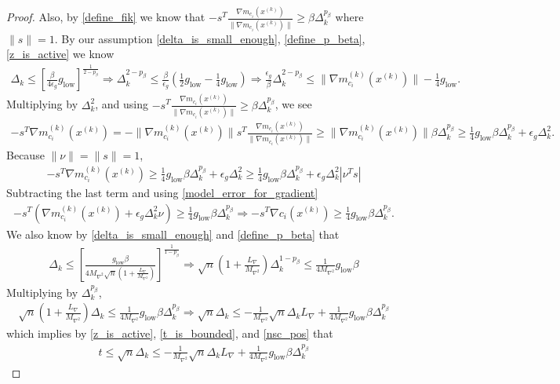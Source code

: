 \documentclass{article}
\theoremstyle{case}
\newcommand{\dk}{\Delta_k}
\newcommand{\gmcik}{{\nabla m_{c_i}^{(k)}\left(\xk\right)}}
\newcommand{\hgik}{{\frac{\nabla m_{c_i}(\xk)}{\|\nabla m_{c_i}(\xk)\|}}}
\newcommand{\lipgrad}{{L_{\nabla}}}
\newcommand{\maxhessian}{{M_{\nabla^2}}}
\newcommand{\mingrad}{{ g_{\text{low}} }}
\newcommand{\xk}{{x^{(k)}}}
\begin{document}
\begin{proof}
Also, by \cref{define_fik} we know that $-s^T \hgik \ge \beta \dk^{p_{\beta}}$ where $\|s\| = 1$.
By our assumption \cref{delta_is_small_enough}, \cref{define_p_beta}, \cref{z_is_active} we know
\begin{align*}
\dk \le \left[\frac{\beta}{4\epsilon_{g}}\mingrad \right]^{\frac 1 {2 - p_{\beta}}}
\Longrightarrow \dk^{2 - p_{\beta}} \le \frac{\beta}{\epsilon_{g}}\left(\frac 1 2\mingrad  - \frac 1 4 \mingrad \right)
\Longrightarrow \frac{\epsilon_{g}}{\beta} \dk^{2 - p_{\beta}} \le \|\gmcik\| - \frac 1 4 \mingrad.
\end{align*}
Multiplying by $\dk^2$, and using $-s^T \hgik \ge \beta \dk^{p_{\beta}}$, we see
\begin{align*}
 -s^T\gmcik =  -\|\gmcik\|s^T\hgik \ge \|\gmcik\|\beta\dk^{p_{\beta}} \ge \frac 1 4 \mingrad  \beta \dk^{p_{\beta}} + \epsilon_{g}\dk^2.
\end{align*}
Because $\|\nu\| = \|s\| = 1$,
\begin{align*}
-s^T\gmcik \ge \frac 1 4 \mingrad  \beta \dk^{p_{\beta}} + \epsilon_{g}\dk^2 \ge \frac 1 4 \mingrad  \beta \dk^{p_{\beta}} + \epsilon_{g}\dk^2|\nu^T s|
\end{align*}
Subtracting the last term and using \cref{model_error_for_gradient}
\begin{align}
-s^T\left(\gmcik + \epsilon_{g}\dk^2\nu\right) \ge \frac 1 4 \mingrad  \beta \dk ^{p_{\beta}}
\Longrightarrow -s^T\nabla c_i(\xk) \ge \frac 1 4 \mingrad  \beta \dk^{p_{\beta}}. \label{nsc_pos}
\end{align}
We also know by \cref{delta_is_small_enough} and \cref{define_p_beta} that
\begin{align*}
\dk \le \left[\frac {\mingrad  \beta} {4\maxhessian\sqrt{n}\left(1 + \frac {\lipgrad} \maxhessian \right)}\right]^{\frac1 {1 - p_{\beta}} }
\Longrightarrow \sqrt{n}\left(1 + \frac {\lipgrad} \maxhessian \right) \dk^{1-p_{\beta}}\le \frac 1 {4\maxhessian} \mingrad  \beta
\end{align*}
Multiplying by $\dk^{p_{\beta}}$,
\begin{align*}
\sqrt{n}\left(1 + \frac {\lipgrad} \maxhessian \right) \dk \le \frac 1 {4\maxhessian} \mingrad  \beta \dk^{p_{\beta}}
\Longrightarrow \sqrt{n} \dk \le -\frac 1 \maxhessian \sqrt{n}\dk \lipgrad + \frac 1 {4\maxhessian} \mingrad  \beta \dk^{p_{\beta}}
\end{align*}
which implies by \cref{z_is_active}, \cref{t_is_bounded}, and \cref{nsc_pos} that
\begin{align*}
t 
\le \sqrt{n} \dk 
\le -\frac 1 \maxhessian \sqrt{n}\dk \lipgrad + \frac 1 {4\maxhessian} \mingrad \beta \dk^{p_{\beta}}

\end{align*}
\end{proof}
\end{document}
